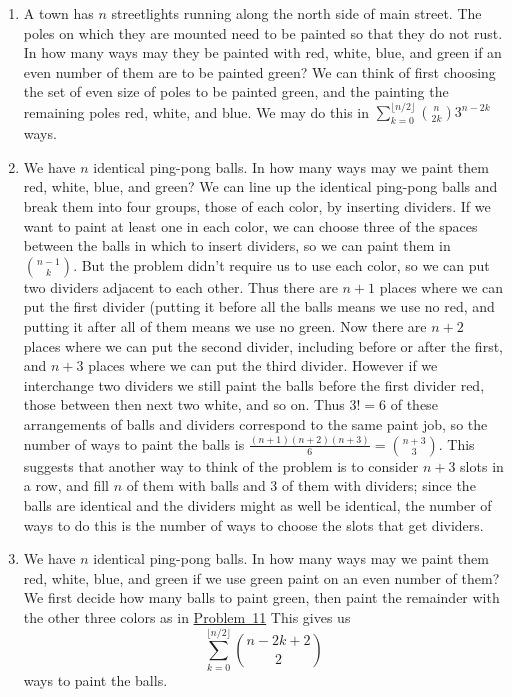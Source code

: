 \documentclass[10pt,]{book}
\theoremstyle{plain}
\theoremstyle{definition}
\numberwithin{equation}{chapter}
\begin{document}
\begin{enumerate}
%
\item\hypertarget{li-18}{}A town has \(n\) streetlights running along the north side of main street.  The poles on which they are mounted need to be painted so that they do not rust.  In how many ways may they be painted with red, white, blue, and green if an even number of them are to be painted green? We can think of first choosing the set of even size of poles to be painted green, and the painting the remaining poles red, white, and blue. We may do this in \(\sum_{k=0}^{\lfloor n/2\rfloor}\binom{n}{2k}3^{n-2k}\) ways.%
%
\item\hypertarget{pingpongpaint}{}We have \(n\) identical ping-pong balls.  In how many ways may we paint them red, white, blue, and green? We can line up the identical ping-pong balls and break them into four groups, those of each color, by inserting dividers. If we want to paint at least one in each color, we can choose three of the spaces between the balls in which to insert dividers, so we can paint them in \(\binom{n-1}{k}\). But the problem didn't require us to use each color, so we can put two dividers adjacent to each other. Thus there are \(n+1\) places where we can put the first divider (putting it before all the balls means we use no red, and putting it after all of them means we use no green. Now there are \(n+2\) places where we can put the second divider, including before or after the first, and \(n+3\) places where we can put the third divider. However if we interchange two dividers we still paint the balls before the first divider red, those between then next two white, and so on. Thus \(3!=6\) of these arrangements of balls and dividers correspond to the same paint job, so the number of ways to paint the balls is \(\frac{(n+1)(n+2)(n+3)}{6} =\binom{n+3}{3}\). This suggests that another way to think of the problem is to consider \(n+3\) slots in a row, and fill \(n\) of them with balls and \(3\) of them with dividers; since the balls are identical and the dividers might as well be identical, the number of ways to do this is the number of ways to choose the slots that get dividers.%
%
\item\hypertarget{li-20}{}We have \(n\) identical ping-pong balls.  In how many ways may we paint them red, white, blue, and green if we use green paint on an even number of them? We first decide how many balls to paint green, then paint the remainder with the other three colors as in \hyperlink{pingpongpaint}{Problem~11} This gives us%
\begin{equation*}
\sum_{k=0}^{\lfloor n/2\rfloor}\binom{n-2k+2}{2}
\end{equation*}
ways to paint the balls.%
%
\end{enumerate}
\typeout{************************************************}
\typeout{************************************************}
\end{document}
